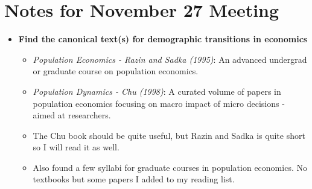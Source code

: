 \documentclass{article}
\begin{document}

\section*{Notes for November 27 Meeting}

\begin{itemize}
\item \textbf{Find the canonical text(s) for demographic transitions in economics}
\begin{itemize}



\item \textit{Population Economics - Razin and Sadka (1995)}: An advanced undergrad or graduate course on population economics.
\item \textit{Population Dynamics - Chu (1998)}: A curated volume of papers in population economics focusing on macro impact of micro decisions - aimed at researchers.

\item The Chu book should be quite useful, but Razin and Sadka is quite short so I will read it as well.

\item Also found a few syllabi for graduate courses in population economics. No textbooks but some papers I added to my reading list.

\end{itemize}


\end{itemize}
\end{document}
